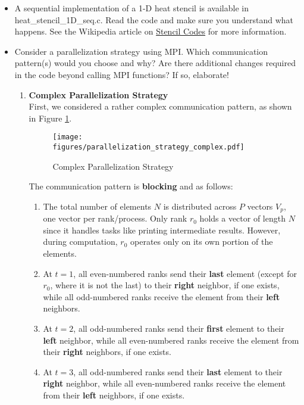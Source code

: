 \documentclass[UTF-8]{article}
\begin{document}
	
	\begin{itemize}
		\item A sequential implementation of a 1-D heat stencil is available in heat\_stencil\_1D\_seq.c. Read the code and make sure you understand what happens. See the Wikipedia article on \href{https://en.wikipedia.org/wiki/Stencil_code}{Stencil Codes} for more information.
		\item Consider a parallelization strategy using MPI. Which communication pattern(s) would you choose and why? Are there additional changes required in the code beyond calling MPI functions? If so, elaborate!
            \begin{enumerate}[label*=\textbf{\alph *)}]
                \item \textbf{Complex Parallelization Strategy}\\
                First, we considered a rather complex communication pattern, as shown in Figure \ref{fig:parallelization_strategy_complex}.
                \begin{figure}[H]
                    \centering
                    \texttt{[image: figures/parallelization\_strategy\_complex.pdf]}
                    \caption{Complex Parallelization Strategy}
                    \label{fig:parallelization_strategy_complex}
                \end{figure}
                The communication pattern is \textbf{blocking} and as follows:
                \begin{enumerate}[label=\textbf{\arabic *)}]
                    \item The total number of elements $N$ is distributed across $P$ vectors $V_p$, one vector per rank/process. Only rank $r_0$ holds a vector of length $N$ since it handles tasks like printing intermediate results. However, during computation, $r_0$ operates only on its own portion of the elements.
                    \item At $t=1$, all even-numbered ranks send their \textbf{last} element (except for $r_0$, where it is not the last) to their \textbf{right} neighbor, if one exists, while all odd-numbered ranks receive the element from their \textbf{left} neighbors.
                    \item At $t=2$, all odd-numbered ranks send their \textbf{first} element to their \textbf{left} neighbor, while all even-numbered ranks receive the element from their \textbf{right} neighbors, if one exists.
                    \item At $t=3$, all odd-numbered ranks send their \textbf{last} element to their \textbf{right} neighbor, while all even-numbered ranks receive the element from their \textbf{left} neighbors, if one exists.

\end{enumerate}
\end{enumerate}
\end{itemize}
\end{document}
